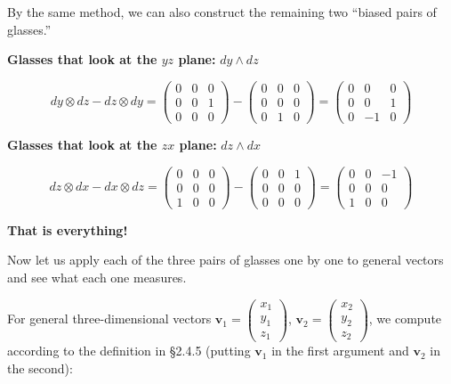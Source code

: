 \documentclass[a4paper,12pt,openany]{book}
\begin{document}
By the same method, we can also construct the remaining two ``biased
pairs of glasses.''

\textbf{Glasses that look at the \(yz\) plane:} \(dy \wedge dz\)

\[
dy \otimes dz - dz \otimes dy = \begin{pmatrix} 0 & 0 & 0 \\ 0 & 0 & 1 \\ 0 & 0 & 0 \end{pmatrix} - \begin{pmatrix} 0 & 0 & 0 \\ 0 & 0 & 0 \\ 0 & 1 & 0 \end{pmatrix} = \begin{pmatrix} 0 & 0 & 0 \\ 0 & 0 & 1 \\ 0 & -1 & 0 \end{pmatrix}
\]

\textbf{Glasses that look at the \(zx\) plane:} \(dz \wedge dx\)

\[
dz \otimes dx - dx \otimes dz = \begin{pmatrix} 0 & 0 & 0 \\ 0 & 0 & 0 \\ 1 & 0 & 0 \end{pmatrix} - \begin{pmatrix} 0 & 0 & 1 \\ 0 & 0 & 0 \\ 0 & 0 & 0 \end{pmatrix} = \begin{pmatrix} 0 & 0 & -1 \\ 0 & 0 & 0 \\ 1 & 0 & 0 \end{pmatrix}
\]

\textbf{That is everything!}

Now let us apply each of the three pairs of glasses one by one to
general vectors and see what each one measures.

For general three-dimensional vectors
\(\mathbf{v}_1 = \begin{pmatrix} x_1 \\ y_1 \\ z_1 \end{pmatrix}\),
\(\mathbf{v}_2 = \begin{pmatrix} x_2 \\ y_2 \\ z_2 \end{pmatrix}\), we
compute according to the definition in §2.4.5 (putting \(\mathbf{v}_1\)
in the first argument and \(\mathbf{v}_2\) in the second):
\end{document}
